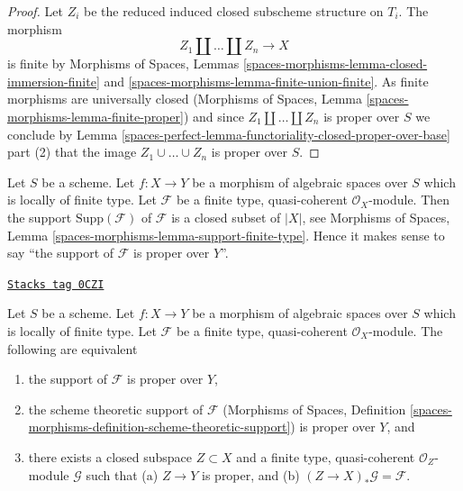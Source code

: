 \begin{proof}
Let $Z_i$ be the reduced induced closed subscheme structure on $T_i$.
The morphism
$$
Z_1 \amalg \ldots \amalg Z_n \longrightarrow X
$$
is finite by Morphisms of Spaces, Lemmas
\ref{spaces-morphisms-lemma-closed-immersion-finite} and
\ref{spaces-morphisms-lemma-finite-union-finite}.
As finite morphisms are universally closed
(Morphisms of Spaces, Lemma \ref{spaces-morphisms-lemma-finite-proper})
and since $Z_1 \amalg \ldots \amalg Z_n$ is proper over $S$
we conclude by
Lemma \ref{spaces-perfect-lemma-functoriality-closed-proper-over-base} part (2)
that the image $Z_1 \cup \ldots \cup Z_n$ is proper over $S$.
\end{proof}

Let $S$ be a scheme.
Let $f : X \to Y$ be a morphism of algebraic spaces over $S$
which is locally
of finite type. Let $\mathcal{F}$ be a finite type, quasi-coherent
$\mathcal{O}_X$-module. Then the support $\text{Supp}(\mathcal{F})$
of $\mathcal{F}$ is a closed subset of $|X|$, see
Morphisms of Spaces, Lemma \ref{spaces-morphisms-lemma-support-finite-type}.
Hence it makes sense to say
``the support of $\mathcal{F}$ is proper over $Y$''.

\begin{lemma}
\label{spaces-perfect-lemma-module-support-proper-over-base}
\href{https://stacks.math.columbia.edu/tag/0CZI}{\texttt{Stacks tag 0CZI}}

Let $S$ be a scheme. Let $f : X \to Y$ be a morphism of
algebraic spaces over $S$ which is locally of finite type.
Let $\mathcal{F}$ be a finite type, quasi-coherent
$\mathcal{O}_X$-module. The following are equivalent
\begin{enumerate}
\item the support of $\mathcal{F}$ is proper over $Y$,
\item the scheme theoretic support of $\mathcal{F}$
(Morphisms of Spaces, Definition
\ref{spaces-morphisms-definition-scheme-theoretic-support})
is proper over $Y$, and
\item there exists a closed subspace $Z \subset X$ and
a finite type, quasi-coherent $\mathcal{O}_Z$-module
$\mathcal{G}$ such that (a) $Z \to Y$ is proper, and (b)
$(Z \to X)_*\mathcal{G} = \mathcal{F}$.
\end{enumerate}
\end{lemma}

